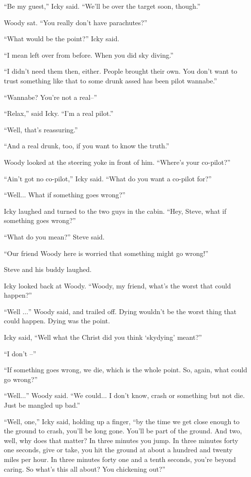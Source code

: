 ``Be my guest,'' Icky said. ``We'll be over the target soon, though.''

Woody sat. ``You really don't have parachutes?''

``What would be the point?'' Icky said.

``I mean left over from before. When you did sky diving.''

``I didn't need them then, either. People brought their own. You don't want to trust something like that to some drunk assed has been pilot wannabe.''

``Wannabe? You're not a real–''

``Relax,'' said Icky. ``I'm a real pilot.''

``Well, that's reassuring.''

``And a real drunk, too, if you want to know the truth.''

Woody looked at the steering yoke in front of him. ``Where's your co-pilot?''

``Ain't got no co-pilot,'' Icky said. ``What do you want a co-pilot for?''

``Well$\ldots$ What if something goes wrong?''

Icky laughed and turned to the two guys in the cabin. ``Hey, Steve, what if something goes wrong?''

``What do you mean?'' Steve said.

``Our friend Woody here is worried that something might go wrong!''

Steve and his buddy laughed.

Icky looked back at Woody. ``Woody, my friend, what's the worst that could happen?''

``Well $\ldots$'' Woody said, and trailed off. Dying wouldn't be the worst thing that could happen. Dying was the point.

Icky said, ``Well what the Christ did you think `skydying' meant?''

``I don't –''

``If something goes wrong, we die, which is the whole point. So, again, what could go wrong?''

``Well$\ldots$'' Woody said. ``We could$\ldots$ I don't know, crash or something but not die. Just be mangled up bad.''

``Well, one,'' Icky said, holding up a finger, ``by the time we get close enough to the ground to crash, you'll be long gone. You'll be part of the ground. And two, well, why does that matter? In three minutes you jump. In three minutes forty one seconds, give or take, you hit the ground at about a hundred and twenty miles per hour. In three minutes forty one and a tenth seconds, you're beyond caring. So what's this all about? You chickening out?''

